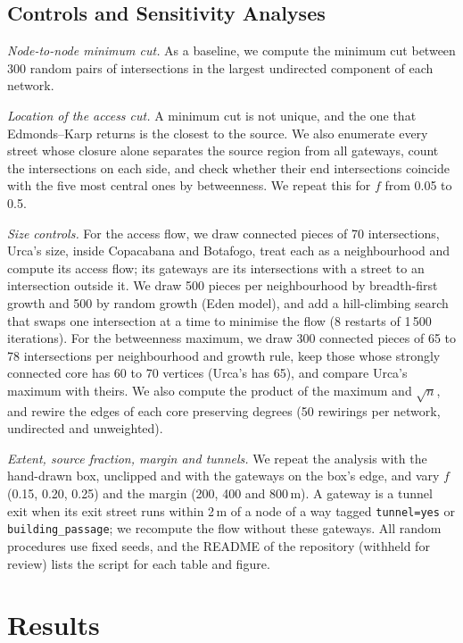 \documentclass[runningheads]{llncs}
\begin{document}
\subsection{Controls and Sensitivity Analyses}
\label{sec:controls}

\emph{Node-to-node minimum cut.} As a baseline, we compute the minimum cut
between 300 random pairs of intersections in the largest undirected component
of each network.

\emph{Location of the access cut.} A minimum cut is not unique, and the one that
Edmonds--Karp returns is the closest to the source. We also enumerate every
street whose closure alone separates the source region from all gateways, count
the intersections on each side, and check whether their end intersections
coincide with the five most central ones by betweenness. We repeat this for $f$
from 0.05 to 0.5.

\emph{Size controls.} For the access flow, we draw connected pieces of 70
intersections, Urca's size, inside Copacabana and Botafogo, treat each as a
neighbourhood and compute its access flow; its gateways are its intersections
with a street to an intersection outside it. We draw 500 pieces per
neighbourhood by breadth-first growth and 500 by random growth (Eden model), and
add a hill-climbing search that swaps one intersection at a time to minimise the
flow (8 restarts of 1\,500 iterations). For the betweenness maximum, we draw 300
connected pieces of 65 to 78 intersections per neighbourhood and growth rule,
keep those whose strongly connected core has 60 to 70 vertices (Urca's has 65),
and compare Urca's maximum with theirs. We also compute the product of the
maximum and $\sqrt{n}$, and rewire the edges of each core preserving degrees (50
rewirings per network, undirected and unweighted).

\emph{Extent, source fraction, margin and tunnels.} We repeat the analysis with
the hand-drawn box, unclipped and with the gateways on the box's edge, and vary
$f$ (0.15, 0.20, 0.25) and the margin (200, 400 and 800\,m). A gateway is a
tunnel exit when its exit street runs within 2\,m of a node of a way tagged
\texttt{tunnel=yes} or \texttt{building\_passage}; we recompute the flow without
these gateways. All random procedures use fixed seeds, and the README of the
repository (withheld for review) lists the script for each table and figure.

\section{Results}
\label{sec:results}
\end{document}
